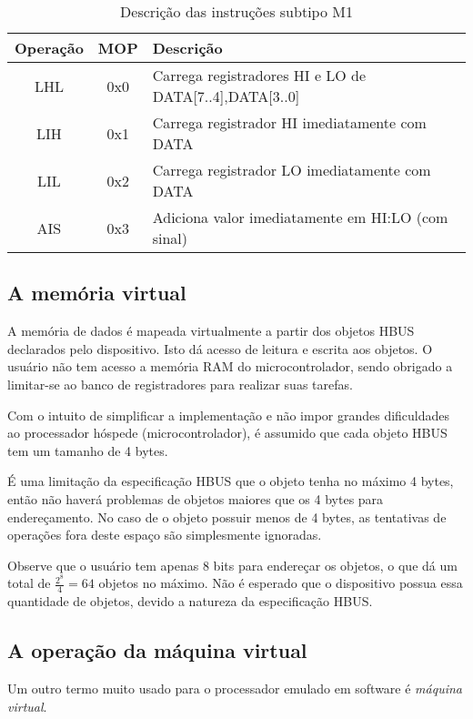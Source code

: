\begin{table}[H]
\caption{Descrição das instruções subtipo M1}
\begin{tabular}{c c p{10cm}}
\hline
Operação 	& 	MOP 		&	Descrição\\
\hline
LHL			&	0x0			&	Carrega registradores HI e LO de DATA[7..4],DATA[3..0]\\
LIH			&	0x1			&	Carrega registrador HI imediatamente com DATA\\
LIL			&	0x2			&	Carrega registrador LO imediatamente com DATA\\
AIS			&	0x3			&	Adiciona valor imediatamente em HI:LO (com sinal)\\

\hline
\end{tabular}
\label{tab:winst}
\end{table}	 

\subsection{A memória virtual}
A memória de dados é mapeada virtualmente a partir dos objetos HBUS declarados pelo dispositivo. Isto dá acesso de leitura e escrita aos objetos. O usuário não tem acesso a memória RAM do microcontrolador, sendo obrigado a limitar-se ao banco de registradores para realizar suas tarefas.

Com o intuito de simplificar a implementação e não impor grandes dificuldades ao processador hóspede (microcontrolador), é assumido que cada objeto HBUS tem um tamanho de 4 bytes.

É uma limitação da especificação HBUS que o objeto tenha no máximo 4 bytes, então não haverá problemas de objetos maiores que os 4 bytes para endereçamento. No caso de o objeto possuir menos de 4 bytes, as tentativas de operações fora deste espaço são simplesmente ignoradas.

Observe que o usuário tem apenas 8 bits para endereçar os objetos, o que dá um total de $\frac{2^8}{4} = 64$ objetos no máximo. Não é esperado que o dispositivo possua essa quantidade de objetos, devido a natureza da especificação HBUS.

\subsection{A operação da máquina virtual}

Um outro termo muito usado para o processador emulado em software é \textit{máquina virtual}.

